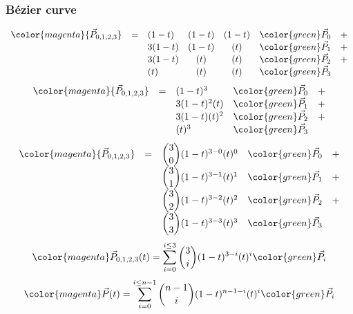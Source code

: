 \begin{frame}
\frametitle{Bézier curve}
  {\tiny
  \[
  \begin{array}{lclccrc}
    \color{magenta}{\vec{P}_{0,1,2,3}} &=& (1-t)&(1-t)&(1-t)&{\color{green}\vec{P}_0} &+ \\
                                       & & 3(1-t)&(1-t)&(  t)&{\color{green}\vec{P}_1} &+ \\
                                       & & 3(1-t)&(  t)&(  t)&{\color{green}\vec{P}_2} &+ \\
                                       & & (  t)&(  t)&(  t)&{\color{green}\vec{P}_3} &
  \end{array}
  \]
  }
  {\tiny
  \[
  \begin{array}{lclrc}
    \color{magenta}{\vec{P}_{0,1,2,3}} &=& (1-t)^3&{\color{green}\vec{P}_0} &+ \\
                                       & & 3(1-t)^2(t)&{\color{green}\vec{P}_1} &+ \\
                                       & & 3(1-t)(t)^2&{\color{green}\vec{P}_2} &+ \\
                                       & & (t)^3&{\color{green}\vec{P}_3} &
  \end{array}
  \]
  }
  {\tiny
  \[
  \begin{array}{lclrc}
    \color{magenta}{\vec{P}_{0,1,2,3}} &=& \dbinom{3}{0}(1-t)^{3-0}(t)^{0}&{\color{green}\vec{P}_0} &+ \\
                                       & & \dbinom{3}{1}(1-t)^{3-1}(t)^{1}&{\color{green}\vec{P}_1} &+ \\
                                       & & \dbinom{3}{2}(1-t)^{3-2}(t)^{2}&{\color{green}\vec{P}_2} &+ \\
                                       & & \dbinom{3}{3}(1-t)^{3-3}(t)^{3}&{\color{green}\vec{P}_3} &
  \end{array}
  \]
  }
  {\tiny
  $$
  {\color{magenta}\vec{P}_{0,1,2,3}(t)} = \sum\limits_{i=0}^{i \leq 3}\dbinom{3}{i}(1-t)^{3-i}(t)^{i}{\color{green}\vec{P}_i} 
  $$
  }
  {\tiny
  $$
  {\color{magenta}\vec{P}(t)} = \sum\limits_{i=0}^{i \leq n-1}\dbinom{n-1}{i}(1-t)^{n-1-i}(t)^{i}{\color{green}\vec{P}_i} 
  $$
  }


\end{frame}


